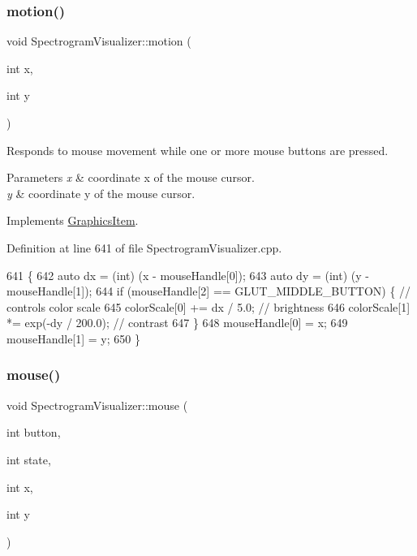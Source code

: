 \subsubsection{\texorpdfstring{motion()}{motion()}}
{\footnotesize\ttfamily void Spectrogram\+Visualizer\+::motion (\begin{DoxyParamCaption}\item[{int}]{x,  }\item[{int}]{y }\end{DoxyParamCaption})\hspace{0.3cm}{\ttfamily [virtual]}}

Responds to mouse movement while one or more mouse buttons are pressed. 
\begin{DoxyParams}{Parameters}
{\em x} & coordinate x of the mouse cursor. \\
\hline
{\em y} & coordinate y of the mouse cursor. \\
\hline
\end{DoxyParams}


Implements \mbox{\hyperlink{classGraphicsItem}{Graphics\+Item}}.



Definition at line 641 of file Spectrogram\+Visualizer.\+cpp.


\begin{DoxyCode}
641                                                \{
642     \textcolor{keyword}{auto} dx = (int) (x - mouseHandle[0]);
643     \textcolor{keyword}{auto} dy = (int) (y - mouseHandle[1]);
644     \textcolor{keywordflow}{if} (mouseHandle[2] == GLUT\_MIDDLE\_BUTTON) \{   \textcolor{comment}{// controls color scale}
645         colorScale[0] += dx / 5.0;  \textcolor{comment}{// brightness}
646         colorScale[1] *= exp(-dy / 200.0); \textcolor{comment}{// contrast}
647     \}
648     mouseHandle[0] = x;
649     mouseHandle[1] = y;
650 \}
\end{DoxyCode}
\mbox{\label{structSpectrogramVisualizer_a949b2e0bfd260e6f8d63b5867f1b4edf}} 
\subsubsection{\texorpdfstring{mouse()}{mouse()}}
{\footnotesize\ttfamily void Spectrogram\+Visualizer\+::mouse (\begin{DoxyParamCaption}\item[{int}]{button,  }\item[{int}]{state,  }\item[{int}]{x,  }\item[{int}]{y }\end{DoxyParamCaption})\hspace{0.3cm}{\ttfamily [virtual]}}

